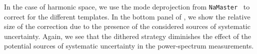 \documentclass[twocolumn]{aastex62}
\begin{document}


In the case of harmonic space, we use the mode deprojection from \texttt{NaMaster}~\citep{2018arXiv180909603A} to correct for the different templates. In the bottom panel of , we show the relative size of the correction due to the presence of the considered sources of systematic uncertainty. Again, we see that the dithered strategy diminishes the effect of the potential sources of systematic uncertainty in the power-spectrum measurements.



\end{document}
